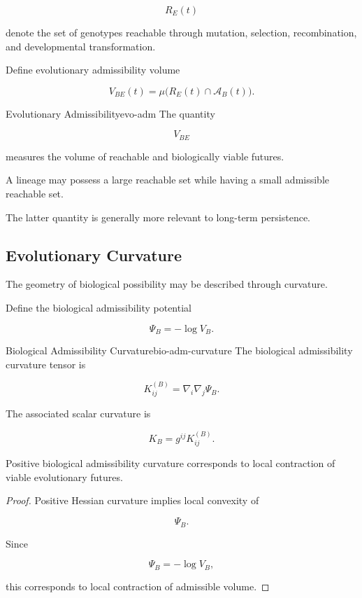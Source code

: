 \documentclass[12pt,twoside,openright]{book}
\newenvironment{prop}
{\begin{proposition}{}{}}
{\end{proposition}}
\begin{document}
\[
R_E(t)
\]

denote the set of genotypes reachable through mutation,
selection, recombination, and developmental
transformation.

Define evolutionary admissibility volume

\[
V_{BE}(t)
=
\mu
\bigl(
R_E(t)
\cap
\mathcal A_B(t)
\bigr).
\]

\begin{definition}{Evolutionary Admissibility}{evo-adm}
The quantity

\[
V_{BE}
\]

measures the volume of reachable and biologically viable
futures.
\end{definition}

A lineage may possess a large reachable set while having
a small admissible reachable set.

The latter quantity is generally more relevant to
long-term persistence.

\subsection{Evolutionary Curvature}

The geometry of biological possibility may be described
through curvature.

Define the biological admissibility potential

\[
\Psi_B
=
-\log V_B.
\]

\begin{definition}{Biological Admissibility Curvature}{bio-adm-curvature}
The biological admissibility curvature tensor is

\[
K^{(B)}_{ij}
=
\nabla_i\nabla_j\Psi_B.
\]
\end{definition}

The associated scalar curvature is

\[
K_B
=
g^{ij}
K^{(B)}_{ij}.
\]

\begin{prop}
Positive biological admissibility curvature corresponds
to local contraction of viable evolutionary futures.
\end{prop}

\begin{proof}
Positive Hessian curvature implies local convexity of

\[
\Psi_B.
\]

Since

\[
\Psi_B=-\log V_B,
\]

this corresponds to local contraction of admissible
volume.
\end{proof}
\end{document}
